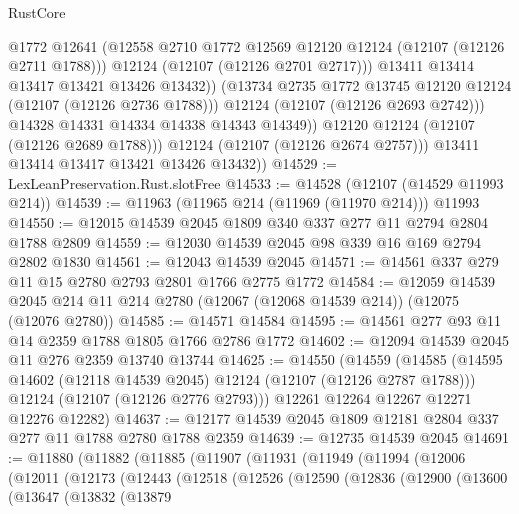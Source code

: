 \begin{lexlean}{RustCore}
\begin{coremodule}
                        @1772
                        @12641
                        (@12558 @2710 @1772 @12569 @12120 @12124 (@12107 (@12126 @2711 @1788)))
                        @12124
                        (@12107 (@12126 @2701 @2717)))
                      @13411
                      @13414
                      @13417
                      @13421
                      @13426
                      @13432))
                  (@13734 @2735 @1772 @13745 @12120 @12124 (@12107 (@12126 @2736 @1788)))
                  @12124
                  (@12107 (@12126 @2693 @2742)))
                @14328
                @14331
                @14334
                @14338
                @14343
                @14349))
            @12120
            @12124
            (@12107 (@12126 @2689 @1788)))
          @12124
          (@12107 (@12126 @2674 @2757)))
        @13411
        @13414
        @13417
        @13421
        @13426
        @13432))
@14529 := LexLeanPreservation.Rust.slotFree
@14533 := @14528 (@12107 (@14529 @11993 @214))
@14539 := @11963 (@11965 @214 (@11969 (@11970 @214))) @11993
@14550 := @12015 @14539 @2045 @1809 @340 @337 @277 @11 @2794 @2804 @1788 @2809
@14559 := @12030 @14539 @2045 @98 @339 @16 @169 @2794 @2802 @1830
@14561 := @12043 @14539 @2045
@14571 := @14561 @337 @279 @11 @15 @2780 @2793 @2801 @1766 @2775 @1772
@14584 := @12059
    @14539
    @2045
    @214
    @11
    @214
    @2780
    (@12067 (@12068 @14539 @214))
    (@12075 (@12076 @2780))
@14585 := @14571 @14584
@14595 := @14561 @277 @93 @11 @14 @2359 @1788 @1805 @1766 @2786 @1772
@14602 := @12094 @14539 @2045 @11 @276 @2359 @13740 @13744
@14625 := @14550
    (@14559
      (@14585
        (@14595 @14602 (@12118 @14539 @2045) @12124 (@12107 (@12126 @2787 @1788)))
        @12124
        (@12107 (@12126 @2776 @2793)))
      @12261
      @12264
      @12267
      @12271
      @12276
      @12282)
@14637 := @12177 @14539 @2045 @1809 @12181 @2804 @337 @277 @11 @1788 @2780 @1788 @2359
@14639 := @12735 @14539 @2045
@14691 := @11880
    (@11882
      (@11885
        (@11907
          (@11931
            (@11949
              (@11994
                (@12006
                  (@12011
                    (@12173
                      (@12443
                        (@12518
                          (@12526
                            (@12590
                              (@12836
                                (@12900
                                  (@13600
                                    (@13647
                                      (@13832
                                        (@13879

\end{coremodule}
\end{lexlean}
